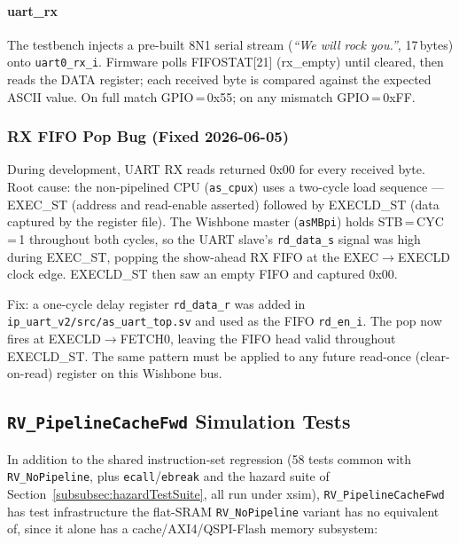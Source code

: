 \paragraph{uart\_rx}
The testbench injects a pre-built 8N1 serial stream
(\textit{``We will rock you.''}, 17\,bytes) onto \texttt{uart0\_rx\_i}.
Firmware polls FIFOSTAT[21] (rx\_empty) until cleared, then reads the DATA
register; each received byte is compared against the expected ASCII value.
On full match GPIO\,=\,0x55; on any mismatch GPIO\,=\,0xFF.

\subsubsection{RX FIFO Pop Bug (Fixed 2026-06-05)}
\label{subsubsec:rxfifobug}

During development, UART RX reads returned 0x00 for every received byte.
Root cause: the non-pipelined CPU (\texttt{as\_cpux}) uses a two-cycle load
sequence --- EXEC\_ST (address and read-enable asserted) followed by EXECLD\_ST
(data captured by the register file).
The Wishbone master (\texttt{asMBpi}) holds STB\,=\,CYC\,=\,1 throughout both
cycles, so the UART slave's \texttt{rd\_data\_s} signal was high during EXEC\_ST,
popping the show-ahead RX FIFO at the EXEC$\to$EXECLD clock edge.
EXECLD\_ST then saw an empty FIFO and captured 0x00.

Fix: a one-cycle delay register \texttt{rd\_data\_r} was added in
\texttt{ip\_uart\_v2/src/as\_uart\_top.sv} and used as the FIFO \texttt{rd\_en\_i}.
The pop now fires at EXECLD$\to$FETCH0, leaving the FIFO head valid throughout
EXECLD\_ST.
The same pattern must be applied to any future read-once (clear-on-read) register
on this Wishbone bus.

\subsection{\texttt{RV\_PipelineCacheFwd} Simulation Tests}
\label{subsec:pipecachefwdsimtest}

In addition to the shared instruction-set regression (58 tests common with
\texttt{RV\_NoPipeline}, plus \texttt{ecall}/\texttt{ebreak} and the hazard
suite of Section~\ref{subsubsec:hazardTestSuite}, all run under xsim),
\texttt{RV\_PipelineCacheFwd} has test infrastructure the flat-SRAM
\texttt{RV\_NoPipeline} variant has no equivalent of, since it alone has a
cache/AXI4/QSPI-Flash memory subsystem:

